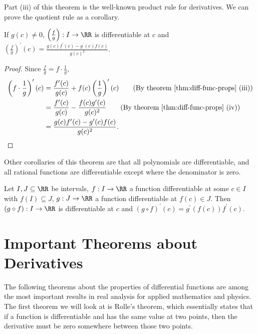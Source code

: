 \documentclass[../real_analysis.tex]{subfiles}
\begin{document}
            Part (iii) of this theorem is the well-known product rule for derivatives. We can prove the quotient rule as a corollary.
            \begin{corollary}
                If $g(c)\neq0$, $\left(\frac{f}{g}\right):I\to\RR$ is differentiable at $c$ and ${\left(\frac{f}{g}\right)^\prime(c)=\frac{g(c)f^\prime(c)-g^\prime(c) f(c)}{g(c)^2}}$.
            \end{corollary}
            \begin{proof}
                Since $\frac{f}{g}=f\cdot\frac{1}{g}$,
                \begin{align}
                    \left(f\cdot\frac{1}{g}\right)^\prime(c)&=\frac{f^\prime(c)}{g(c)}+f(c)\left(\frac{1}{g}\right)^\prime(c)\tag{By theorem \ref{thm:diff-func-props} (iii)}\\
                    &=\frac{f^\prime(c)}{g(c)}-\frac{f(c)g^\prime(c)}{g(c)^2}\tag{By theorem \ref{thm:diff-func-props} (iv)}\\
                    &=\frac{g(c)f^\prime(c)-g^\prime(c)f(c)}{g(c)^2}.
                \end{align}
            \end{proof}
            Other corollaries of this theorem are that all polynomials are differentiable, and all rational functions are differentiable except where the denominator is zero.
            \begin{theorem}
                Let $I,J\subseteq\RR$ be intervals, $f:I\to\RR$ a function differentiable at some $c\in I$ with $f(I)\subseteq J$, $g:J\to\RR$ a function differentiable at $f(c)\in J$. Then $(g\circ f):I\to\RR$ is differentiable at $c$ and $(g\circ f)^\prime(c)=g^\prime(f(c))f^\prime(c)$.
            \end{theorem}

    \section{Important Theorems about Derivatives}\label{sec:theorems-about-derivatives}
        The following theorems about the properties of differential functions are among the most important results in real analysis for applied mathematics and physics. The first theorem we will look at is Rolle's theorem, which essentially states that if a function is differentiable and has the same value at two points, then the derivative must be zero somewhere between those two points.
        
\end{document}
